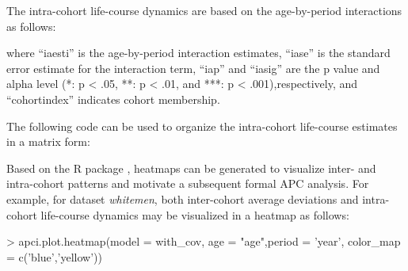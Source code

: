 The intra-cohort life-course dynamics are based on the age-by-period interactions as follows:

where ``iaesti'' is the age-by-period interaction estimates, ``iase'' is the standard error estimate for the interaction term, ``iap'' and ``iasig'' are the p value and alpha level (*: p < .05, **: p < .01, and ***: p < .001),respectively, and ``cohortindex'' indicates cohort membership. 

The following code can be used to organize the intra-cohort life-course estimates in a matrix form:


Based on the R package {} \citep{ggplot2}, heatmaps can be generated to visualize inter- and intra-cohort patterns and motivate a subsequent formal APC analysis. For example, for dataset \textit{whitemen}, both inter-cohort average deviations and intra-cohort life-course dynamics may be visualized in a heatmap as follows:

\begin{example}
> apci.plot.heatmap(model = with_cov, age = "age",period = 'year',
                  color_map = c('blue','yellow'))
\end{example}

